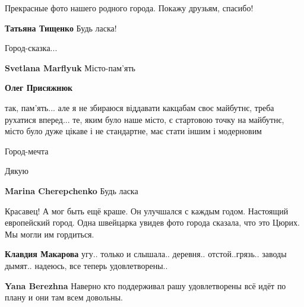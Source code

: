 
 
 
 
 

\qqSecCmt


Прекрасные фото нашего родного города.
Покажу друзьям, спасибо!

\textbf{Татьяна Тищенко} Будь ласка!


Город-сказка...

\begin{itemize} %
\textbf{Svetlana Marflyuk} Місто-пам'ять

\textbf{Олег Присяжнюк} 

так, пам'ять... але я не збираюся віддавати какцабам своє майбутнє, треба рухатися
вперед... те, яким було наше місто, є стартовою точку на майбутнє, місто було дуже
цікаве і не стандартне, має стати іншим і модерновим

\end{itemize} %


Город-мечта


Дякую 💛🌟💛

\begin{itemize} %
\textbf{Marina Cherepchenko} Будь ласка
\end{itemize} %


Красавец! А мог быть ещё краше. Он улучшался с каждым годом. Настоящий
европейский город. Одна швейцарка увидев фото города сказала, что это Цюрих. Мы
могли им гордиться.

\begin{itemize} %
\textbf{Клавдия Макарова} угу.. только и слышала.. деревня.. отстой..грязь.. заводы дымят.. надеюсь, все теперь удовлетворены..

\textbf{Yana Berezhna} Наверно кто поддерживал рашу удовлетворены всё идёт по плану и они там всем довольны.
\end{itemize} %

